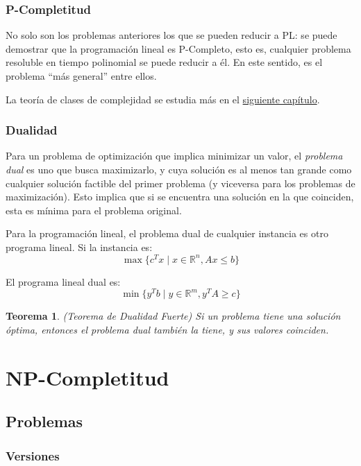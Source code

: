 \documentclass[a4paper]{report}
\newcommand{\R}{\mathbb{R}}
\newtheorem*{theorem*}{Teorema}
\begin{document}
\subsection{P-Completitud}

No solo son los problemas anteriores los que se pueden reducir a PL: se puede demostrar que la programación lineal es P-Completo, esto es, cualquier problema resoluble en tiempo polinomial se puede reducir a él. En este sentido, es el problema ``más general'' entre ellos.

La teoría de clases de complejidad se estudia más en el \hyperref[capitulo-np-completitud]{siguiente capítulo}.

\subsection{Dualidad}

Para un problema de optimización que implica minimizar un valor, el \textit{problema dual} es uno que busca maximizarlo, y cuya solución es al menos tan grande como cualquier solución factible del primer problema (y viceversa para los problemas de maximización). Esto implica que si se encuentra una solución en la que coinciden, esta es mínima para el problema original.

Para la programación lineal, el problema dual de cualquier instancia es otro programa lineal. Si la instancia es:
$$\max{\{c^T x \mid x \in \R^n, Ax \leq b\}}$$

El programa lineal dual es:
$$\min{\{y^T b \mid y \in \R^m, y^T A \geq c\}}$$

\begin{theorem*}
    (Teorema de Dualidad Fuerte) Si un problema tiene una solución óptima, entonces el problema dual también la tiene, y sus valores coinciden.
\end{theorem*}

\chapter{NP-Completitud}
\label{capitulo-np-completitud}

\section{Problemas}

\subsection{Versiones}
\end{document}
